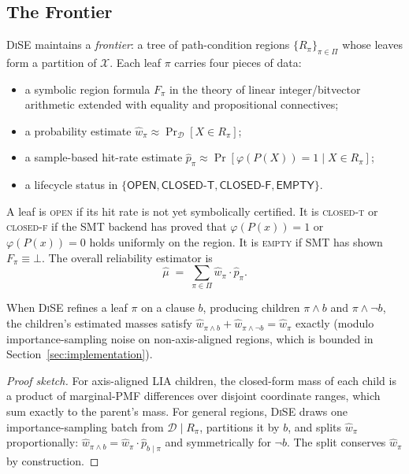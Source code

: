 \documentclass[runningheads]{llncs}
\providecommand{\Cref}[1]{Section~\ref{#1}}
\newcommand{\inX}{\mathcal{X}}
\newcommand{\dist}{\mathcal{D}}
\newcommand{\prog}{P}
\newcommand{\prop}{\varphi}
\newcommand{\muhat}{\hat{\mu}}
\newcommand{\partset}{\Pi}
\newcommand{\hwhat}{\hat{w}}
\newcommand{\hpathat}{\hat{p}}
\newcommand{\toolname}{\textsc{DiSE}}
\begin{document}
\subsection{The Frontier}\label{sec:frontier}

\toolname{} maintains a \emph{frontier}: a tree of path-condition
regions $\{R_\pi\}_{\pi \in \partset}$ whose leaves form a partition
of $\inX$.  Each leaf $\pi$ carries four pieces of data:
\begin{itemize}
\item a symbolic region formula $F_\pi$ in the theory of
  linear integer/bitvector arithmetic extended with equality and
  propositional connectives;
\item a probability estimate $\hwhat_\pi \approx \Pr_\dist[X \in R_\pi]$;
\item a sample-based hit-rate estimate
  $\hpathat_\pi \approx \Pr[\prop(\prog(X))=1 \mid X \in R_\pi]$;
\item a lifecycle status in
  $\{\mathsf{OPEN}, \mathsf{CLOSED\text{-}T},
    \mathsf{CLOSED\text{-}F}, \mathsf{EMPTY}\}$.
\end{itemize}

A leaf is \textsc{open} if its hit rate is not yet symbolically
certified.  It is \textsc{closed-t} or \textsc{closed-f} if the SMT
backend has proved that $\prop(\prog(x)) = 1$ or $\prop(\prog(x)) = 0$
holds uniformly on the region.  It is \textsc{empty} if SMT has shown
$F_\pi \equiv \bot$.  The overall reliability estimator is
\begin{equation}\label{eq:muhat-def}
  \muhat \;=\; \sum_{\pi \in \partset} \hwhat_\pi \cdot \hpathat_\pi.
\end{equation}

\begin{lemma}\label{lem:mass-conservation}
  When \toolname{} refines a leaf $\pi$ on a clause $b$, producing
  children $\pi{\wedge}b$ and $\pi{\wedge}\neg b$, the children's
  estimated masses satisfy
  $\hwhat_{\pi \wedge b} + \hwhat_{\pi \wedge \neg b} = \hwhat_\pi$
  exactly (modulo importance-sampling noise on non-axis-aligned
  regions, which is bounded in \Cref{sec:implementation}).
\end{lemma}

\begin{proof}[Proof sketch]
  For axis-aligned LIA children, the closed-form mass of each child
  is a product of marginal-PMF differences over disjoint coordinate
  ranges, which sum exactly to the parent's mass.  For general
  regions, \toolname{} draws one importance-sampling batch from
  $\dist \mid R_\pi$, partitions it by $b$, and splits $\hwhat_\pi$
  proportionally: $\hwhat_{\pi \wedge b} = \hwhat_\pi \cdot
  \hpathat_{b \mid \pi}$ and symmetrically for $\neg b$.  The split
  conserves $\hwhat_\pi$ by construction.
\end{proof}
\end{document}
